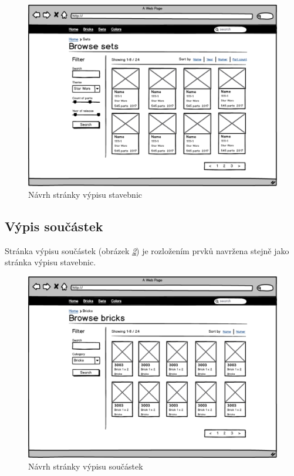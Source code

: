 \begin{figure}[htbp]
    \centering
    \includegraphics[width=\textwidth,height=\textheight,keepaspectratio]{pdfs/wireframe_sets.pdf}
    \caption{Návrh stránky výpisu stavebnic}\label{wireframe-stavebnice-seznam}
\end{figure}

\subsection{Výpis součástek}
Stránka výpisu součástek (obrázek \emph{\ref{wireframe-soucaska-seznam}}) je rozložením prvků navržena stejně jako stránka výpisu stavebnic. 

\begin{figure}[htbp]
    \centering
    \includegraphics[width=\textwidth,height=\textheight,keepaspectratio]{pdfs/wireframe_bricks.pdf}
    \caption{Návrh stránky výpisu součástek}\label{wireframe-soucaska-seznam}
\end{figure}

